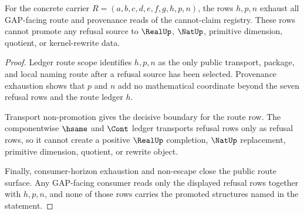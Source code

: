 \begin{theorem}
\label{thm:axis-zeckendorf-cannot-claim-gap-ledger-exhaustion}
For the concrete carrier $R=(a,b,c,d,e,f,g,h,p,n)$, the rows $h,p,n$ exhaust all GAP-facing route and provenance reads of the cannot-claim registry. These rows cannot promote any refusal source to $\RealUp$, $\NatUp$, primitive dimension, quotient, or kernel-rewrite data.
\end{theorem}
\begin{proof}
Ledger route scope identifies $h,p,n$ as the only public transport, package, and local naming route after a refusal source has been selected. Provenance exhaustion shows that $p$ and $n$ add no mathematical coordinate beyond the seven refusal rows and the route ledger $h$.

Transport non-promotion gives the decisive boundary for the route row. The componentwise $\hsame$ and $\Cont$ ledger transports refusal rows only as refusal rows, so it cannot create a positive $\RealUp$ completion, $\NatUp$ replacement, primitive dimension, quotient, or rewrite object.

Finally, consumer-horizon exhaustion and non-escape close the public route surface. Any GAP-facing consumer reads only the displayed refusal rows together with $h,p,n$, and none of those rows carries the promoted structures named in the statement.
\end{proof}

